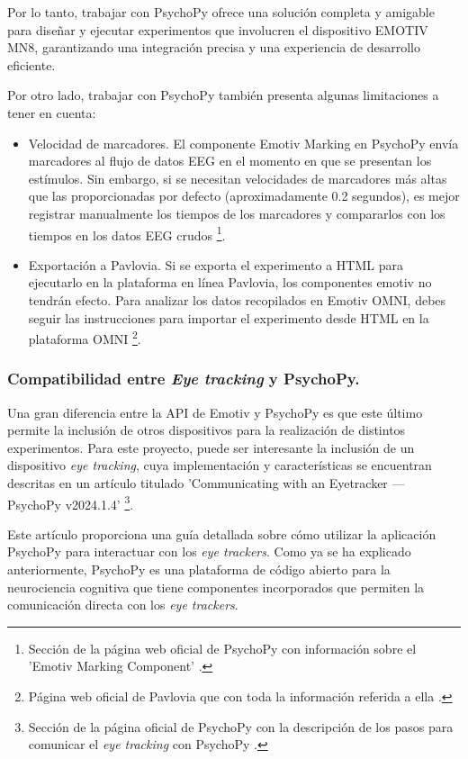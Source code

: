 Por lo tanto, trabajar con PsychoPy ofrece una solución completa y amigable para diseñar y ejecutar experimentos que involucren el dispositivo EMOTIV MN8, garantizando una integración precisa y una experiencia de desarrollo eficiente.

Por otro lado, trabajar con PsychoPy también presenta algunas limitaciones a tener en cuenta:
\begin{itemize}
    \item Velocidad de marcadores. El componente Emotiv Marking en PsychoPy envía marcadores al flujo de datos EEG en el momento en que se presentan los estímulos. Sin embargo, si se necesitan velocidades de marcadores más altas que las proporcionadas por defecto (aproximadamente 0.2 segundos), es mejor registrar manualmente los tiempos de los marcadores y compararlos con los tiempos en los datos EEG crudos \cite{psychopyEmotivMarking}\footnote{Sección de la página web oficial de PsychoPy con información sobre el 'Emotiv Marking Component' \cite{psychopyEmotivMarking}.}.
    \item Exportación a Pavlovia. Si se exporta el experimento a HTML para ejecutarlo en la plataforma en línea Pavlovia, los componentes emotiv no tendrán efecto. Para analizar los datos recopilados en Emotiv OMNI, debes seguir las instrucciones para importar el experimento desde HTML en la plataforma OMNI \cite{pavlovia}\footnote{Página web oficial de Pavlovia que con toda la información referida a ella \cite{pavlovia}.}.
\end{itemize}

\subsubsection{Compatibilidad entre \textit{Eye tracking} y PsychoPy.}
Una gran diferencia entre la API de Emotiv y PsychoPy  es que este último permite la inclusión de otros dispositivos para la realización de distintos experimentos. Para este proyecto, puede ser interesante la inclusión de un dispositivo \textit{eye tracking}, cuya implementación y características se encuentran descritas en un artículo titulado 'Communicating with an Eyetracker — PsychoPy v2024.1.4' \cite{PsychoPyEyeTracking}\footnote{Sección de la página oficial de PsychoPy con la descripción de los pasos para comunicar el \textit{eye tracking} con PsychoPy \cite{PsychoPyEyeTracking}.}.

Este artículo proporciona una guía detallada sobre cómo utilizar la aplicación PsychoPy para interactuar con los \textit{eye trackers}. Como ya se ha explicado anteriormente, PsychoPy es una plataforma de código abierto para la neurociencia cognitiva que tiene componentes incorporados que permiten la comunicación directa con los \textit{eye trackers}.

